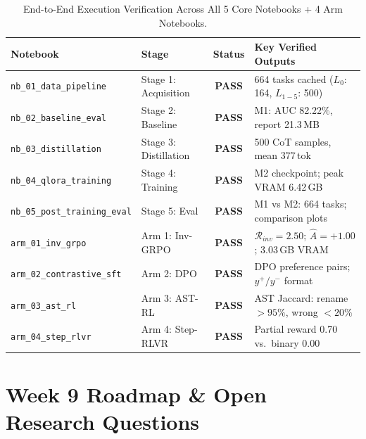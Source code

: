 \documentclass[12pt, a4paper]{article}
\begin{document}
\begin{table}[H]
\centering
\small
\caption{End-to-End Execution Verification Across All 5 Core Notebooks + 4 Arm Notebooks.}
\label{tab:nb_verification}
\begin{tabularx}{\textwidth}{l l c X}
\toprule
\textbf{Notebook} & \textbf{Stage} & \textbf{Status} & \textbf{Key Verified Outputs} \\
\midrule
\texttt{nb\_01\_data\_pipeline}      & Stage 1: Acquisition  & \textcolor{SuccessGreen}{\textbf{PASS}} & 664 tasks cached ($L_0$: 164, $L_{1-5}$: 500) \\
\texttt{nb\_02\_baseline\_eval}      & Stage 2: Baseline     & \textcolor{SuccessGreen}{\textbf{PASS}} & M1: AUC 82.22\%, report 21.3\,MB \\
\texttt{nb\_03\_distillation}        & Stage 3: Distillation & \textcolor{SuccessGreen}{\textbf{PASS}} & 500 CoT samples, mean 377\,tok \\
\texttt{nb\_04\_qlora\_training}     & Stage 4: Training     & \textcolor{SuccessGreen}{\textbf{PASS}} & M2 checkpoint; peak VRAM 6.42\,GB \\
\texttt{nb\_05\_post\_training\_eval}& Stage 5: Eval         & \textcolor{SuccessGreen}{\textbf{PASS}} & M1 vs M2: 664 tasks; comparison plots \\
\addlinespace[3pt]
\texttt{arm\_01\_inv\_grpo}          & Arm 1: Inv-GRPO       & \textcolor{SuccessGreen}{\textbf{PASS}} & $\mathcal{R}_{inv}=2.50$; $\hat{A}=+1.00$; 3.03\,GB VRAM \\
\texttt{arm\_02\_contrastive\_sft}   & Arm 2: DPO            & \textcolor{SuccessGreen}{\textbf{PASS}} & DPO preference pairs; $y^+/y^-$ format \\
\texttt{arm\_03\_ast\_rl}            & Arm 3: AST-RL         & \textcolor{SuccessGreen}{\textbf{PASS}} & AST Jaccard: rename $>95\%$, wrong $<20\%$ \\
\texttt{arm\_04\_step\_rlvr}         & Arm 4: Step-RLVR      & \textcolor{SuccessGreen}{\textbf{PASS}} & Partial reward 0.70 vs.\ binary 0.00 \\
\bottomrule
\end{tabularx}
\end{table}

\section{Week 9 Roadmap \& Open Research Questions}
\end{document}
